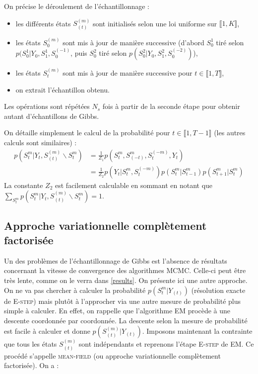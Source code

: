 \documentclass[10pt,a4paper]{article}
\newcommand{\mcmc}{\textsc{MCMC}}
\newcommand{\Estep}{\textsc{E-step}}
\newcommand{\EM}{\textsc{EM}}
\newcommand{\meanfield}{\textsc{mean-field}}
\begin{document}
On précise le déroulement de l'échantillonnage :
\begin{itemize}
  \item les différents états $S_{(t)}^{(m)}$ sont initialisés selon une loi 
    uniforme sur $\llbracket 1,K \rrbracket$,
  \item les états $S_0^{(m)}$ sont mis à jour de manière successive (d'abord 
    $S_0^1$ tiré selon $p(S_0^1 \vert Y_{0}, S_1^1, S_0^{(-1)}$, puis $S_0^2$ tiré 
    selon $p(S_0^2 \vert Y_{0}, S_1^2, S_0^{(-2)})$),
  \item les états $S_t^{(m)}$ sont mis à jour de manière successive pour $t \in 
    \llbracket 1,T \rrbracket$,
  \item on extrait l'échantillon obtenu.
\end{itemize}
Les opérations sont répétées $N_s$ fois à partir de la seconde étape pour
obtenir autant d'échantillons de Gibbs.

On détaille simplement le calcul de la probabilité pour $t \in \llbracket 1,T-1 
\rrbracket$ (les autres calculs sont similaires) :
\begin{equation}
\begin{align}
p(S_t^m \vert Y_t, S_{(t)}^{(m)} \backslash S_t^m)&=\frac{1}{Z_1}p(S_t^{m}, 
S_{(-t)}^{m}, S_{t}^{(-m)},Y_t) \\
&=\frac{1}{Z_2}p(Y_t \vert S_t^{m},S_t^{(-m)}) p(S_t^m \vert S_{t-1}^m) 
p(S_{t+1}^m \vert S_t^m)
\end{align}
\end{equation}
La constante $Z_2$ est facilement calculable en sommant en notant que 
$\underset{S_t^m}{\sum}p(S_t^m \vert Y_t, S_{(t)}^{(m)} \backslash S_t^m)=1$.

\subsection{Approche variationnelle complètement factorisée}

Un des problèmes de l'échantillonnage de Gibbs est l'absence de résultats 
concernant la vitesse de convergence des algorithmes \mcmc.
Celle-ci peut être très lente, comme on le verra dans \ref{results}.
On présente ici une autre approche.
On ne va pas chercher à calculer la probabilité $p( S_t^m \vert Y_{(t)})$
(résolution exacte de \Estep{}) mais plutôt à l'approcher via une autre mesure
de probabilité plus simple à calculer.
En effet, on rappelle que l'algorithme \EM{} procède à une descente coordonnée
par coordonnée.
La descente selon la mesure de probabilité est facile à calculer et donne
$p(S_{(t)}^{(m)} \vert Y_{(t)})$.
Imposons maintenant la contrainte que tous les états $S_{(t)}^{(m)}$ sont
indépendants et reprenons l'étape \Estep{} de \EM.
Ce procédé s'appelle \meanfield{} (ou approche variationnelle complètement
factorisée).
On a :
\end{document}
